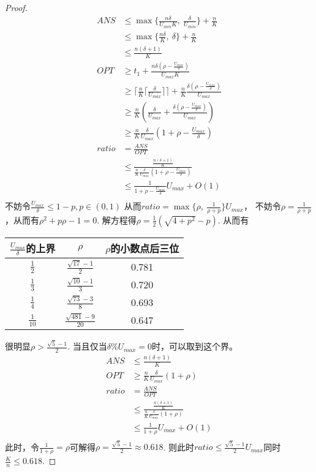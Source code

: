 \documentclass[UTF8]{ctexart}
\begin{document}
\begin{enumerate}[(1)]
\begin{proof}
\begin{align*}
		ANS &\le \max \{ \frac{n\delta}{U_{min}K},\ \frac{\delta}{U_{min}} \} + \frac{n}{K} \\
			&\le \max \{ \frac{n\delta}{K},\ \delta \} + \frac{n}{K} \\
			&\le \frac{n(\delta+1)}{K} \\
		OPT &\ge t_1 + \frac{n\delta(\rho - \frac{U_{max}}{\delta})}{U_{max}K} \\
			&\ge \lceil \frac{n}{K} \lceil \frac{\delta}{U_{max}} \rceil \rceil + \frac{n}{K}\frac{\delta(\rho - \frac{U_{max}}{\delta})}{U_{max}} \\
			&\ge \frac{n}{K} (\frac{\delta}{U_{max}} + \frac{\delta(\rho - \frac{U_{max}}{\delta})}{U_{max}}) \\
 			&\ge \frac{n}{K} \frac{\delta}{U_{max}} (1 + \rho - \frac{U_{max}}{\delta})  \\
		ratio &= \frac{ANS}{OPT} \\
			  &\le \frac{\frac{n(\delta+1)}{K}}{\frac{n}{K} \frac{\delta}{U_{max}} (1 + \rho - \frac{U_{max}}{\delta})} \\
			  &\le \frac{1}{1 + \rho - \frac{U_{max}}{\delta}} U_{max} + O(1) \\
	\end{align*}
	不妨令$\frac{U_{max}}{\delta} \le 1-p, p \in (0,1)$
	从而$ratio = \max\{ \rho,\ \frac{1}{\rho + p} \} U_{max}$，
	不妨令$\rho = \frac{1}{\rho + p}$，从而有$\rho^2 + p\rho - 1 = 0$.
	解方程得$\rho = \frac{1}{2}(\sqrt{4+p^2}-p)$.
	从而有
	\begin{center}
	\begin{tabular}{|c|c|c|}
		\hline
			$\frac{U_{max}}{\delta}$的上界 &$\rho$ &$\rho$的小数点后三位 \\
		\hline
			$\frac{1}{2}$ &$\frac{\sqrt{17}-1}{2}$ &0.781 \\
		\hline
			$\frac{1}{3}$ &$\frac{\sqrt{10}-1}{3}$ &0.720 \\
		\hline
			$\frac{1}{4}$ &$\frac{\sqrt{73}-3}{8}$ &0.693 \\
		\hline
			$\frac{1}{10}$ &$\frac{\sqrt{481}-9}{20}$ &0.647 \\
		\hline
	\end{tabular}
	\end{center}
	很明显$\rho > \frac{\sqrt{5}-1}{2}$. 当且仅当$\delta\%U_{max} = 0$时，可以取到这个界。
	\begin{align*}
		ANS &\le \frac{n(\delta+1)}{K} \\
		OPT &\ge \frac{n}{K} \frac{\delta}{U_{max}} (1 + \rho)  \\
		ratio &= \frac{ANS}{OPT} \\
			  &\le \frac{\frac{n(\delta+1)}{K}}{\frac{n}{K} \frac{\delta}{U_{max}} (1 + \rho)} \\
			  &\le \frac{1}{1 + \rho} U_{max} + O(1) \\
	\end{align*}
	此时，令$\frac{1}{1 + \rho} = \rho$可解得$\rho = \frac{\sqrt{5}-1}{2} \approx 0.618$.
	则此时$ratio \le \frac{\sqrt{5}-1}{2} U_{max}$同时$\frac{K}{n} \le 0.618$.
	\end{proof}
	

\end{enumerate}
\end{document}
